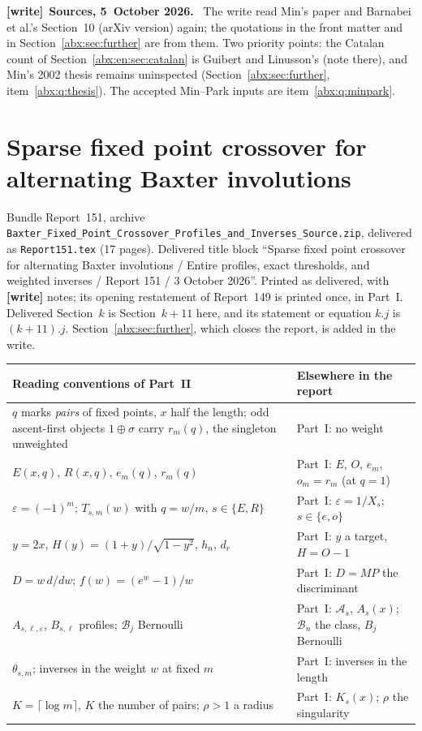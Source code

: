 \documentclass[11pt,letterpaper]{article}
\numberwithin{equation}{section}
\theoremstyle{remark}\newtheorem{remark}[theorem]{Remark}
\newcommand{\BB}{\mathcal B}
\newcommand{\eps}{\varepsilon}
\newcommand{\file}[1]{\nolinkurl{#1}}
\newenvironment{writenote}[1][]{\par\smallskip\begingroup\small
 \noindent\textbf{[write]}\if\relax\detokenize{#1}\relax\else~\textbf{#1.}\fi\ }%
 {\par\endgroup\smallskip}
\newcommand{\partsource}[1]{\par\noindent\begin{minipage}{\textwidth}\small #1\end{minipage}\par\medskip}
\begin{document}
\begin{writenote}[Sources, 5~October 2026]
The write read Min's paper and Barnabei et al.'s Section~10 (arXiv version) again; the quotations in the front matter and in Section~\ref{abx:sec:further} are from them. Two priority points: the Catalan count of Section~\ref{abx:en:sec:catalan} is Guibert and Linusson's (note there), and Min's 2002 thesis remains uninspected (Section~\ref{abx:sec:further}, item~\ref{abx:q:thesis}). The accepted Min--Park inputs are item~\ref{abx:q:minpark}.
\end{writenote}

\clearpage
\part{Sparse fixed point crossover for alternating Baxter involutions}\label{abx:fp:part}
\partsource{Bundle Report~151, archive \file{Baxter_Fixed_Point_Crossover_Profiles_and_Inverses_Source.zip}, delivered as \file{Report151.tex} (17 pages). Delivered title block ``Sparse fixed point crossover for alternating Baxter involutions / Entire profiles, exact thresholds, and weighted inverses / Report 151 / 3 October 2026''. Printed as delivered, with \textbf{[write]} notes; its opening restatement of Report~149 is printed once, in Part~I. Delivered Section~$k$ is Section~$k+11$ here, and its statement or equation $k.j$ is $(k+11).j$. Section~\ref{abx:sec:further}, which closes the report, is added in the write.}
\begin{center}
\small
\begin{tabular}{@{}>{\raggedright\arraybackslash}p{} >{\raggedright\arraybackslash}p{}@{}}
\toprule
Reading conventions of Part~II & Elsewhere in the report\\
\midrule
$q$ marks \emph{pairs} of fixed points, $x$ half the length; odd ascent-first objects $1\oplus\sigma$ carry $r_m(q)$, the singleton unweighted & Part~I: no weight\\
$E(x,q)$, $R(x,q)$, $e_m(q)$, $r_m(q)$ & Part~I: $E$, $O$, $e_m$, $o_m=r_m$ (at $q=1$)\\
$\eps=(-1)^m$; $T_{s,m}(w)$ with $q=w/m$, $s\in\{E,R\}$ & Part~I: $\eps=1/X_s$; $s\in\{e,o\}$\\
$y=2x$, $H(y)=(1+y)/\sqrt{1-y^2}$, $h_n$, $d_r$ & Part~I: $y$ a target, $H=O-1$\\
$D=w\,d/dw$; $f(w)=(e^w-1)/w$ & Part~I: $D=MP$ the discriminant\\
$A_{s,\ell,\eps}$, $B_{s,\ell}$ profiles; $\mathcal B_j$ Bernoulli & Part~I: $\mathcal A_s$, $A_s(x)$; $\BB_n$ the class, $B_j$ Bernoulli\\
$\theta_{s,m}$; inverses in the weight $w$ at fixed $m$ & Part~I: inverses in the length\\
$K=\lceil\log m\rceil$, $K$ the number of pairs; $\rho>1$ a radius & Part~I: $K_s(x)$; $\rho$ the singularity\\
\bottomrule
\end{tabular}
\end{center}
\end{document}

